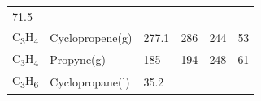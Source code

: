 \documentclass[
  9pt,
]{extbook}
\theoremstyle{definition}
\theoremstyle{definition}
\theoremstyle{definition}
\theoremstyle{remark}
\begin{document}
\begin{longtable}[]{@{}llllll@{}}
\begin{minipage}[t]{0.14\columnwidth}
71.5\strut
\end{minipage}\tabularnewline
\begin{minipage}[t]{0.07\columnwidth}\raggedright
C\textsubscript{3}H\textsubscript{4}\strut
\end{minipage} & \begin{minipage}[t]{0.17\columnwidth}\raggedright
Cyclopropene(g)\strut
\end{minipage} & \begin{minipage}[t]{0.15\columnwidth}\raggedright
277.1\strut
\end{minipage} & \begin{minipage}[t]{0.15\columnwidth}\raggedright
286\strut
\end{minipage} & \begin{minipage}[t]{0.14\columnwidth}\raggedright
244\strut
\end{minipage} & \begin{minipage}[t]{0.14\columnwidth}\raggedright
53\strut
\end{minipage}\tabularnewline
\begin{minipage}[t]{0.07\columnwidth}\raggedright
C\textsubscript{3}H\textsubscript{4}\strut
\end{minipage} & \begin{minipage}[t]{0.17\columnwidth}\raggedright
Propyne(g)\strut
\end{minipage} & \begin{minipage}[t]{0.15\columnwidth}\raggedright
185\strut
\end{minipage} & \begin{minipage}[t]{0.15\columnwidth}\raggedright
194\strut
\end{minipage} & \begin{minipage}[t]{0.14\columnwidth}\raggedright
248\strut
\end{minipage} & \begin{minipage}[t]{0.14\columnwidth}\raggedright
61\strut
\end{minipage}\tabularnewline
\begin{minipage}[t]{0.07\columnwidth}\raggedright
C\textsubscript{3}H\textsubscript{6}\strut
\end{minipage} & \begin{minipage}[t]{0.17\columnwidth}\raggedright
Cyclopropane(l)\strut
\end{minipage} & \begin{minipage}[t]{0.15\columnwidth}\raggedright
35.2\strut
\end{minipage} & \begin{minipage}[t]{0.15\columnwidth}\raggedright

\end{minipage}
\end{longtable}
\end{document}
